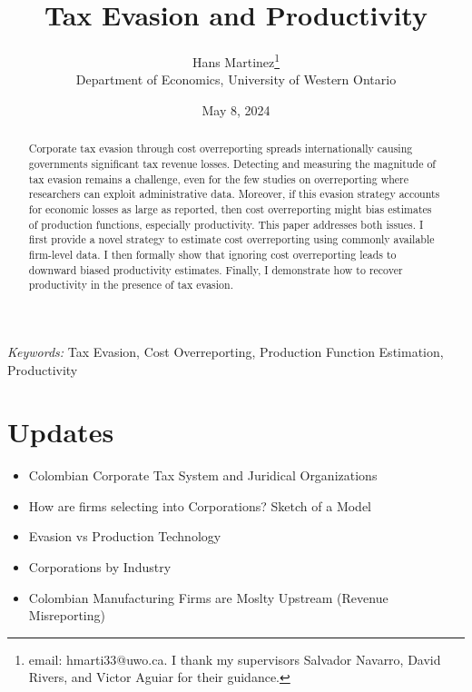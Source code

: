 \documentclass[
  12pt]{article}
\providecommand{\tightlist}{%
  \setlength{\itemsep}{0pt}\setlength{\parskip}{0pt}}\usepackage{longtable,booktabs,array}
\theoremstyle{definition}
\theoremstyle{remark}
\begin{document}
\def\spacingset#1{\renewcommand{\baselinestretch}%
{#1}\small\normalsize} \spacingset{1}



\date{May 8, 2024}
\title{\bf Tax Evasion and Productivity}
\author{
Hans Martinez\thanks{email: hmarti33@uwo.ca. I thank my supervisors
Salvador Navarro, David Rivers, and Victor Aguiar for their guidance.}\\
Department of Economics, University of Western Ontario\\
}
\maketitle

\bigskip
\bigskip
\begin{abstract}
Corporate tax evasion through cost overreporting spreads internationally
causing governments significant tax revenue losses. Detecting and
measuring the magnitude of tax evasion remains a challenge, even for the
few studies on overreporting where researchers can exploit
administrative data. Moreover, if this evasion strategy accounts for
economic losses as large as reported, then cost overreporting might bias
estimates of production functions, especially productivity. This paper
addresses both issues. I first provide a novel strategy to estimate cost
overreporting using commonly available firm-level data. I then formally
show that ignoring cost overreporting leads to downward biased
productivity estimates. Finally, I demonstrate how to recover
productivity in the presence of tax evasion.
\end{abstract}

\noindent%
{\it Keywords:} Tax Evasion, Cost Overreporting, Production Function
Estimation, Productivity
\vfill

\newpage
\spacingset{1.9} %

\section*{Updates}\label{updates}

\begin{itemize}
\tightlist
\item
  Colombian Corporate Tax System and Juridical Organizations
\item
  How are firms selecting into Corporations? Sketch of a Model
\item
  Evasion vs Production Technology
\item
  Corporations by Industry
\item
  Colombian Manufacturing Firms are Moslty Upstream (Revenue
  Misreporting)
\end{itemize}
\end{document}
